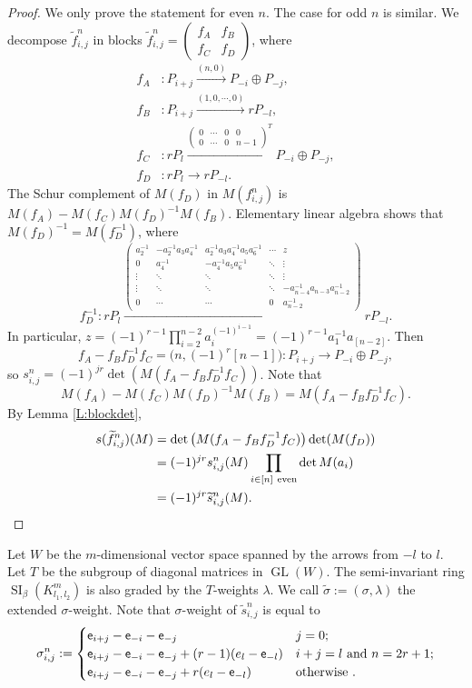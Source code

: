 \documentclass{amsart}
\theoremstyle{definition}
\theoremstyle{remark}
\numberwithin{equation}{section}
\DeclareMathOperator{\GL}{GL}
\DeclareMathOperator{\SI}{SI}
\newcommand{\wtd}[1]{\widetilde{#1}}
\newcommand{\e}{{\sf e}}
\newcommand{\sm}[1]{{\left(\begin{smallmatrix}#1\end{smallmatrix}\right)}}
\newcommand{\ijn}{_{i,j}^{n}}
\begin{document}
\begin{proof} We only prove the statement for even $n$. The case for odd $n$ is similar.
	We decompose $\wtd{f}\ijn$ in blocks $\wtd{f}\ijn=\sm{f_{A} & f_{B} \\ f_{C} & f_{D}}$, where
	\begin{align*}f_{A}&: P_{i+j}\xrightarrow{(n,0)} P_{-i}\oplus P_{-j},\\
	f_{B}&: P_{i+j}\xrightarrow{(1,0,\cdots,0)} rP_{-l},\\
	f_{C}&: rP_l\xrightarrow{\sm{0&\cdots&0&0\\0&\cdots&0&n-1}^T}P_{-i}\oplus P_{-j},\\
	f_{D}&: rP_l \xrightarrow{} rP_{-l}.
	\end{align*}
	The Schur complement of $M(f_{D})$ in $M(f\ijn)$ is $M(f_{A})-M(f_{C})M(f_{D})^{-1}M(f_{B})$.
	Elementary linear algebra shows that $M(f_{D})^{-1}=M(f_{D}^{-1})$, where
	$$f_{D}^{-1}: r P_{l} \xrightarrow{
		\sm{a_2^{-1} & -a_2^{-1}a_3a_4^{-1} & a_2^{-1}a_3a_4^{-1}a_5a_6^{-1} &\cdots & z\\
			0 & a_4^{-1} & -a_4^{-1}a_5a_6^{-1} &\ddots & \vdots\\
			\vdots &\ddots &\ddots &\ddots& \vdots\\
			\vdots & \ddots & \ddots & \ddots& -a_{n-4}^{-1}a_{n-3}a_{n-2}^{-1}\\
			0&\cdots&\cdots &0&a_{n-2}^{-1} }} r P_{-l}.$$
	In particular, $z=(-1)^{r-1}\prod_{i=2}^{n-2} a_i^{(-1)^{i-1}}=(-1)^{r-1}a_1^{-1}a_{[n-2]}.$
	Then $$f_{A}-f_{B}f_{D}^{-1}f_{C}=\big(n,(-1)^r [n-1]\big): P_{i+j}\xrightarrow{} P_{-i}\oplus P_{-j},$$
	so $s\ijn=(-1)^{jr}\det\left( M(f_A-f_{B}f_{D}^{-1}f_{C}) \right)$.
	Note that 
	$$M(f_{A})-M(f_{C})M(f_{D})^{-1}M(f_{B})=M(f_A-f_{B}f_{D}^{-1}f_{C}).$$
	By Lemma \ref{L:blockdet},
	\begin{align*}s(\wtd{f}\ijn)(M) &= \det\left( M(f_A-f_{B}f_{D}^{-1}f_{C}) \right)\det(M(f_{D}))\\
	&=(-1)^{jr}s\ijn(M)\prod_{i\in[n]\rm\ even} \det M(a_i)\\
	&=(-1)^{jr}\wtd{s}\ijn(M).\end{align*}
\end{proof}


Let $W$ be the $m$-dimensional vector space spanned by the arrows from $-l$ to $l$.
Let $T$ be the subgroup of diagonal matrices in $\GL(W)$.
The semi-invariant ring $\SI_\beta(K_{l_1,l_2}^m)$ is also graded by the $T$-weights $\lambda$.
We call $\wtd{\sigma}:=(\sigma,\lambda)$ the extended $\sigma$-weight. 
Note that $\sigma$-weight of $\wtd{s}\ijn$ is equal to 
\begin{equation*} \label{l:sigmaijn} \sigma\ijn:=\begin{cases}
\e_{i+j}-\e_{-i}-\e_{-j}& j=0;\\
\e_{i+j}-\e_{-i}-\e_{-j}+(r-1)(e_{l}-\e_{-l})& i+j=l \text{ and $n=2r+1$};\\
\e_{i+j}-\e_{-i}-\e_{-j}+r(e_{l}-\e_{-l})& \text{otherwise }. 
\end{cases} \end{equation*}
\end{document}
